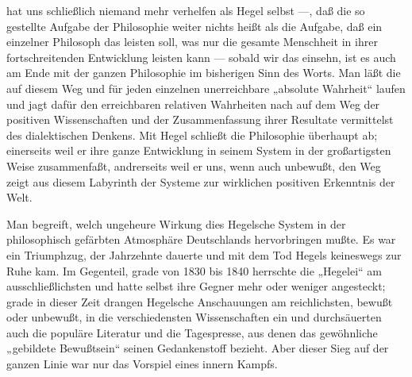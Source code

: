 hat uns schließlich niemand mehr verhelfen als Hegel selbst ---, daß die
so gestellte Aufgabe der Philosophie weiter nichts heißt als die
Aufgabe, daß ein einzelner Philosoph das leisten soll, was nur die
gesamte Menschheit in ihrer fortschreitenden Entwicklung leisten kann ---
sobald wir das einsehn, ist es auch am Ende mit der ganzen Philosophie
im bisherigen Sinn des Worts. Man läßt die auf diesem Weg und für jeden
einzelnen unerreichbare „absolute Wahrheit`` laufen und jagt dafür den
erreichbaren relativen Wahrheiten nach auf dem Weg der positiven
Wissenschaften und der Zusammenfassung ihrer Resultate vermittelst des
dialektischen Denkens. Mit Hegel schließt die Philosophie überhaupt ab;
einerseits weil er ihre ganze Entwicklung in seinem System in der
großartigsten Weise zusammenfaßt, andrerseits weil er uns, wenn auch
unbewußt, den Weg zeigt aus diesem Labyrinth der Systeme zur wirklichen
positiven Erkenntnis der Welt.

Man begreift, welch ungeheure Wirkung dies Hegelsche System in
der philosophisch gefärbten Atmosphäre Deutschlands hervorbringen mußte.
Es war ein Triumphzug, der Jahrzehnte dauerte und mit dem Tod Hegels
keineswegs zur Ruhe kam. Im Gegenteil, grade von 1830 bis 1840 herrschte
die „Hegelei`` am ausschließlichsten und hatte selbst ihre Gegner mehr
oder weniger angesteckt; grade in dieser Zeit drangen Hegelsche
Anschauungen am reichlichsten, bewußt oder unbewußt, in die
verschiedensten Wissenschaften ein und durchsäuerten auch die populäre
Literatur und die Tagespresse, aus denen das gewöhnliche „gebildete
Bewußtsein`` seinen Gedankenstoff bezieht. Aber dieser Sieg auf der
ganzen Linie war nur das Vorspiel eines innern Kampfs.

